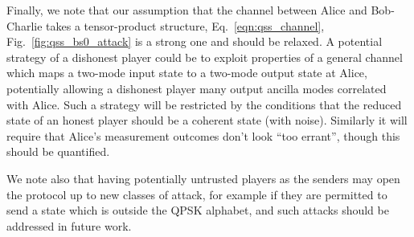 Finally, we note that our assumption that the channel between Alice and Bob-Charlie takes a tensor-product structure, Eq.~\ref{eqn:qss_channel}, Fig.~\ref{fig:qss_bs0_attack} is a strong one and should be relaxed. A potential strategy of a dishonest player could be to exploit properties of a general channel which maps a two-mode input state to a two-mode output state at Alice, potentially allowing a dishonest player many output ancilla modes correlated with Alice. Such a strategy will be restricted by the conditions that the reduced state of an honest player should be a coherent state (with noise). Similarly it will require that Alice's measurement outcomes don't look ``too errant'', though this should be quantified.



We note also that having potentially untrusted players as the senders may open the protocol up to new classes of attack, for example if they are permitted to send a state which is outside the QPSK alphabet, and such attacks should be addressed in future work.




